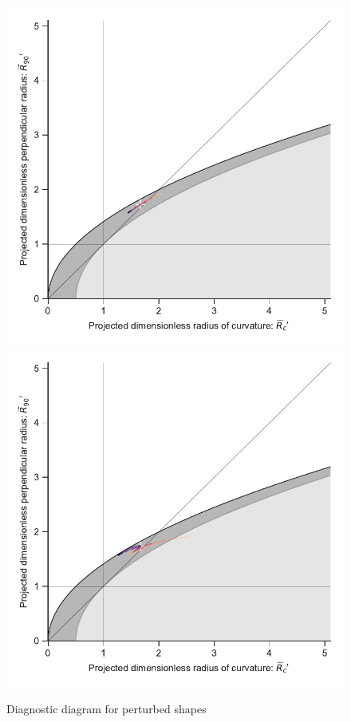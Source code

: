 \begin{figure}
  \centering
  \includegraphics[width=\linewidth]
  {figs/wilkinoid-R90-vs-Rc-wave-A010-N10}
  \includegraphics[width=\linewidth]
  {figs/wilkinoid-R90-vs-Rc-wave-A005-N20}
  \caption{Diagnostic diagram for perturbed shapes}
  \label{fig:perturb-Rc-R90}
\end{figure}


